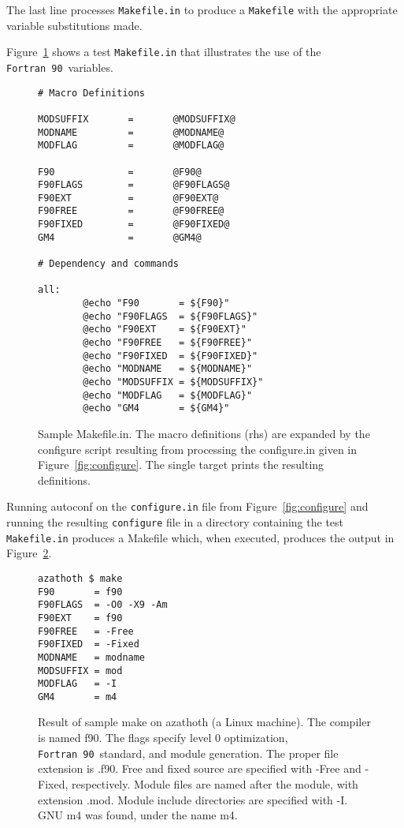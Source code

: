 \documentclass[11pt]{nmemo}
\newcommand{\fninety}{\texttt{Fortran~90}}
\begin{document}
The last line processes \texttt{Makefile.in} to produce a
\texttt{Makefile} with the appropriate variable substitutions made.

Figure~\ref{fig:makefile} shows a test \texttt{Makefile.in} that
illustrates the use of the \fninety\ variables.  
\begin{figure}[phbt]
\hrulefill
\begin{verbatim}
# Macro Definitions

MODSUFFIX       =       @MODSUFFIX@
MODNAME         =       @MODNAME@
MODFLAG         =       @MODFLAG@

F90             =       @F90@
F90FLAGS        =       @F90FLAGS@
F90EXT          =       @F90EXT@
F90FREE         =       @F90FREE@
F90FIXED        =       @F90FIXED@
GM4             =       @GM4@

# Dependency and commands

all:
        @echo "F90       = ${F90}"
        @echo "F90FLAGS  = ${F90FLAGS}"
        @echo "F90EXT    = ${F90EXT}"
        @echo "F90FREE   = ${F90FREE}"
        @echo "F90FIXED  = ${F90FIXED}"
        @echo "MODNAME   = ${MODNAME}"
        @echo "MODSUFFIX = ${MODSUFFIX}"
        @echo "MODFLAG   = ${MODFLAG}"
        @echo "GM4       = ${GM4}"
\end{verbatim}%
\caption{Sample Makefile.in.  The macro definitions (rhs) are expanded
by the configure script resulting from processing the configure.in
given in Figure~\ref{fig:configure}.  The single target prints the
resulting definitions.}\label{fig:makefile} \hrulefill
\end{figure}

Running autoconf on the \texttt{configure.in} file from
Figure~\ref{fig:configure} and running the resulting
\texttt{configure} file in a directory containing the test
\texttt{Makefile.in} produces a {Makefile} which, when executed,
produces the output in Figure~\ref{fig:make}.
\begin{figure}[phbt]
\hrulefill
\begin{verbatim}
azathoth $ make
F90       = f90
F90FLAGS  = -O0 -X9 -Am
F90EXT    = f90
F90FREE   = -Free
F90FIXED  = -Fixed
MODNAME   = modname
MODSUFFIX = mod
MODFLAG   = -I
GM4       = m4
\end{verbatim}%
\caption{Result of sample make on azathoth (a Linux
machine).  The compiler is named f90.  The flags specify level 0
optimization, \fninety\ standard, and module generation.  The proper
file extension is .f90.  Free and fixed source are specified with
-Free and -Fixed, respectively.  Module files are named after the
module, with extension .mod.  Module include directories are specified
with -I.  GNU m4 was found, under the name m4.}\label{fig:make}
\hrulefill
\end{figure}
\end{document}
